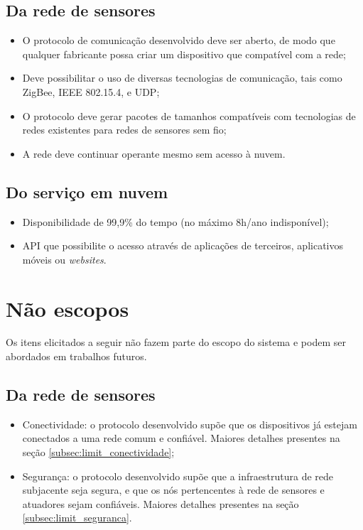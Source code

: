 \subsection{Da rede de sensores}
\begin{itemize}
	\item O protocolo de comunicação desenvolvido deve ser aberto, de modo que qualquer fabricante possa criar um dispositivo que compatível com a rede;
	\item Deve possibilitar o uso de diversas tecnologias de comunicação, tais como ZigBee, IEEE 802.15.4, e UDP;
	\item O protocolo deve gerar pacotes de tamanhos compatíveis com tecnologias de redes existentes para redes de sensores sem fio;
	\item A rede deve continuar operante mesmo sem acesso à nuvem.
\end{itemize}

\subsection{Do serviço em nuvem}
\begin{itemize}
	\item Disponibilidade de 99,9\% do tempo (no máximo 8h/ano indisponível); 
	\item API que possibilite o acesso através de aplicações de terceiros, aplicativos móveis ou \textit{websites}.
\end{itemize}

\section{Não escopos}
Os itens elicitados a seguir não fazem parte do escopo do sistema e podem ser abordados em trabalhos futuros.

\subsection{Da rede de sensores}
\begin{itemize}
	\item Conectividade: o protocolo desenvolvido supõe que os dispositivos já estejam conectados a uma rede comum e confiável. Maiores detalhes presentes na seção \ref{subsec:limit_conectividade};
	\item Segurança: o protocolo desenvolvido supõe que a infraestrutura de rede subjacente seja segura, e que os nós pertencentes à rede de sensores e atuadores sejam confiáveis. Maiores detalhes presentes na seção \ref{subsec:limit_seguranca}.
\end{itemize}


